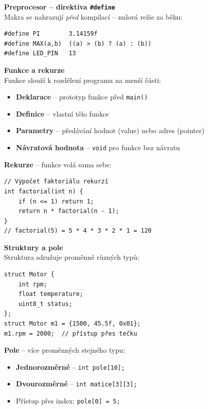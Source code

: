 \documentclass[a4paper,10pt]{article}
\begin{document}
\begin{vysvetlenibox}
\textbf{Preprocesor -- direktiva \texttt{\#define}}\\
Makra se nahrazují \textit{před} kompilací -- nulová režie za běhu:
\begin{vzorcebox}
\begin{verbatim}
#define PI        3.14159f
#define MAX(a,b)  ((a) > (b) ? (a) : (b))
#define LED_PIN   13
\end{verbatim}
\end{vzorcebox}

\textbf{Funkce a rekurze}\\
Funkce slouží k rozdělení programu na menší části:
\begin{itemize}[noitemsep, leftmargin=1.4em, topsep=4pt]
    \item \textbf{Deklarace} -- prototyp funkce před \texttt{main()}
    \item \textbf{Definice} -- vlastní tělo funkce
    \item \textbf{Parametry} -- předávání hodnot (value) nebo adres (pointer)
    \item \textbf{Návratová hodnota} -- \texttt{void} pro funkce bez návratu
\end{itemize}

\textbf{Rekurze} -- funkce volá sama sebe:
\begin{vzorcebox}
\begin{verbatim}
// Výpočet faktoriálu rekurzí
int factorial(int n) {
    if (n <= 1) return 1;
    return n * factorial(n - 1);
}
// factorial(5) = 5 * 4 * 3 * 2 * 1 = 120
\end{verbatim}
\end{vzorcebox}

\textbf{Struktury a pole}\\
Struktura sdružuje proměnné různých typů:
\begin{vzorcebox}
\begin{verbatim}
struct Motor {
    int rpm;
    float temperature;
    uint8_t status;
};
struct Motor m1 = {1500, 45.5f, 0x01};
m1.rpm = 2000;  // přístup přes tečku
\end{verbatim}
\end{vzorcebox}

\textbf{Pole} -- více proměnných stejného typu:
\begin{itemize}[noitemsep, leftmargin=1.4em, topsep=4pt]
    \item \textbf{Jednorozměrné} -- \texttt{int pole[10];}
    \item \textbf{Dvourozměrné} -- \texttt{int matice[3][3];}
    \item Přístup přes index: \texttt{pole[0] = 5;}
\end{itemize}


\end{vysvetlenibox}
\end{document}
